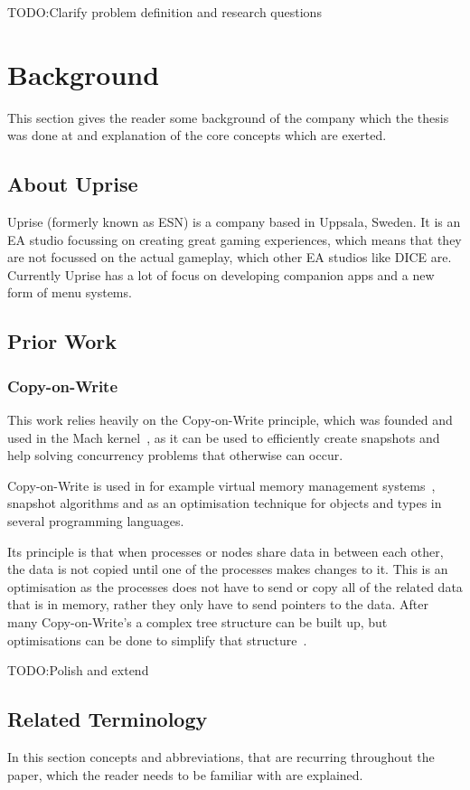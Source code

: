 \documentclass[a4paper,12pt]{article}
\newcommand{\fix}{\colorbox{yellow!30}{TODO:}}
\begin{document}
\fix Clarify problem definition and research questions
\newpage
\section{Background}
This section gives the reader some background of the company which the thesis was done at and
explanation of the core concepts which are exerted. 

\subsection{About Uprise}
Uprise (formerly known as ESN) is a company based in Uppsala, Sweden. It is an EA studio focussing 
on creating great gaming experiences, which means that they are not focussed on the actual 
gameplay, which other EA studios like DICE are. Currently Uprise has a lot of focus on developing 
companion apps and a new form of menu systems.

\subsection{Prior Work}
\subsubsection{Copy-on-Write}
This work relies heavily on the Copy-on-Write principle, which was founded and used in the Mach
kernel~\cite{COPYONWRITE}, as it can be used to efficiently create snapshots and help solving
concurrency problems that otherwise can occur.

Copy-on-Write is used in for example virtual memory management systems~\cite{VIRTCOW}, snapshot
algorithms and as an optimisation technique for objects and types in several programming
languages\cite{LANGCOW}.

Its principle is that when processes or nodes share data in between each other, the data is not
copied until one of the processes makes changes to it. This is an optimisation as the processes does
not have to send or copy all of the related data that is in memory, rather they only have to send
pointers to the data. After many Copy-on-Write's a complex tree structure can be built up, but
optimisations can be done to simplify that structure~\cite{COPYONWRITE2}.

\fix Polish and extend

\newpage
\subsection{Related Terminology}
In this section concepts and abbreviations, that are recurring throughout the paper, which the
reader needs to be familiar with are explained.
\end{document}

